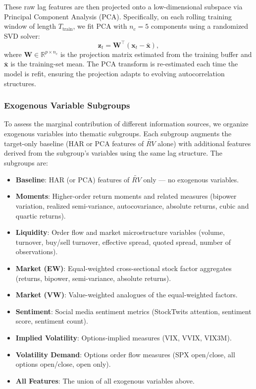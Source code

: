 These raw lag features are then projected onto a low-dimensional subspace via Principal Component Analysis (PCA). Specifically, on each rolling training window of length $T_{\mathrm{train}}$, we fit PCA with $n_c = 5$ components using a randomized SVD solver:
\begin{equation}
    \mathbf{z}_t = \mathbf{W}^{\top}(\mathbf{x}_t - \bar{\mathbf{x}}),
    \label{eq:pca}
\end{equation}
where $\mathbf{W} \in \mathbb{R}^{p \times n_c}$ is the projection matrix estimated from the training buffer and $\bar{\mathbf{x}}$ is the training-set mean. The PCA transform is re-estimated each time the model is refit, ensuring the projection adapts to evolving autocorrelation structures.

\subsubsection{Exogenous Variable Subgroups}
\label{sec:subgroups}

To assess the marginal contribution of different information sources, we organize exogenous variables into thematic subgroups. Each subgroup augments the target-only baseline (HAR or PCA features of $\widetilde{RV}$ alone) with additional features derived from the subgroup's variables using the same lag structure. The subgroups are:

\begin{itemize}
    \item \textbf{Baseline}: HAR (or PCA) features of $\widetilde{RV}$ only --- no exogenous variables.
    \item \textbf{Moments}: Higher-order return moments and related measures (bipower variation, realized semi-variance, autocovariance, absolute returns, cubic and quartic returns).
    \item \textbf{Liquidity}: Order flow and market microstructure variables (volume, turnover, buy/sell turnover, effective spread, quoted spread, number of observations).
    \item \textbf{Market (EW)}: Equal-weighted cross-sectional stock factor aggregates (returns, bipower, semi-variance, absolute returns).
    \item \textbf{Market (VW)}: Value-weighted analogues of the equal-weighted factors.
    \item \textbf{Sentiment}: Social media sentiment metrics (StockTwits attention, sentiment score, sentiment count).
    \item \textbf{Implied Volatility}: Options-implied measures (VIX, VVIX, VIX3M).
    \item \textbf{Volatility Demand}: Options order flow measures (SPX open/close, all options open/close, open only).
    \item \textbf{All Features}: The union of all exogenous variables above.
\end{itemize}

